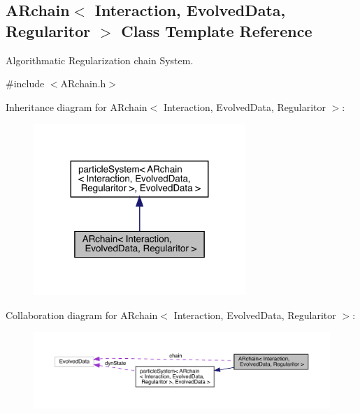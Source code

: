 \hypertarget{class_a_rchain}{}\subsection{A\+Rchain$<$ Interaction, Evolved\+Data, Regularitor $>$ Class Template Reference}
\label{class_a_rchain}


Algorithmatic Regularization chain System.  




{\ttfamily \#include $<$A\+Rchain.\+h$>$}



Inheritance diagram for A\+Rchain$<$ Interaction, Evolved\+Data, Regularitor $>$\+:\nopagebreak
\begin{figure}[H]
\begin{center}
\leavevmode
\includegraphics[width=227pt]{class_a_rchain__inherit__graph}
\end{center}
\end{figure}


Collaboration diagram for A\+Rchain$<$ Interaction, Evolved\+Data, Regularitor $>$\+:\nopagebreak
\begin{figure}[H]
\begin{center}
\leavevmode
\includegraphics[width=350pt]{class_a_rchain__coll__graph}
\end{center}
\end{figure}
